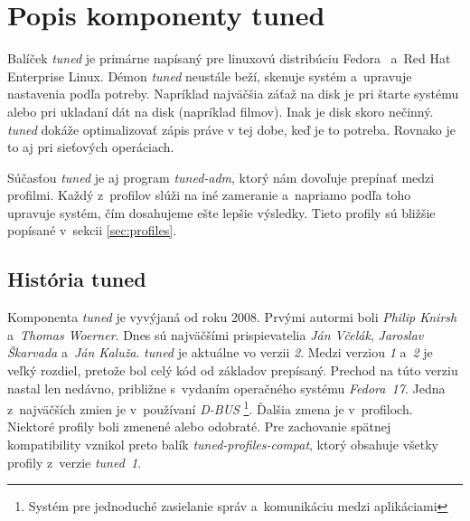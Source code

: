 %
%

\chapter{Popis komponenty tuned}

Balíček \emph{tuned} je primárne napísaný pre linuxovú distribúciu
Fedora~\cite{fedoraHomepage} a~Red Hat Enterprise Linux. Démon \emph{tuned} neustále
beží, skenuje systém a~upravuje nastavenia podľa potreby. Napríklad najväčšia
záťaž na disk je pri štarte systému alebo pri ukladaní dát na disk (napríklad
filmov). Inak je disk skoro nečinný. \emph{tuned} dokáže optimalizovať zápis práve v
tej dobe, keď je to potreba. Rovnako je to aj pri sieťových operáciach.


Súčasťou \emph{tuned} je aj program \emph{tuned-adm}, ktorý nám dovoľuje
prepínať medzi profilmi. Každý z~profilov slúži na iné zameranie a~napriamo
podľa toho upravuje systém, čím dosahujeme ešte lepšie výsledky. Tieto profily
sú bližšie popísané v~sekcii \ref{sec:profiles}.

%
%

\section{História tuned}
\label{sec:historiaTuned}

Komponenta \emph{tuned} je vyvýjaná od roku 2008. Prvými autormi boli
\emph{Philip Knirsh} a~\emph{Thomas Woerner}. Dnes sú najväčšími prispievatelia
\emph{Ján Včelák}, \emph{Jaroslav Škarvada} a~\emph{Ján Kaluža}.  \emph{tuned}
je aktuálne vo verzii \emph{2}. Medzi verziou \emph{1} a~\emph{2} je veľký
rozdiel, pretože bol celý kód od základov prepísaný. Prechod na túto verziu
nastal len nedávno, približne s~vydaním operačného systému \emph{Fedora~17}.
Jedna z~najväčších zmien je v~používaní \emph{D-BUS} \footnote{Systém pre
jednoduché zasielanie správ a~komunikáciu medzi aplikáciami}. Ďalšia zmena je
v~profiloch. Niektoré profily boli zmenené alebo odobraté. Pre zachovanie
spätnej kompatibility vznikol preto balík \emph{tuned-profiles-compat}, ktorý
obsahuje všetky profily z~verzie \emph{tuned~1}.

%
%

